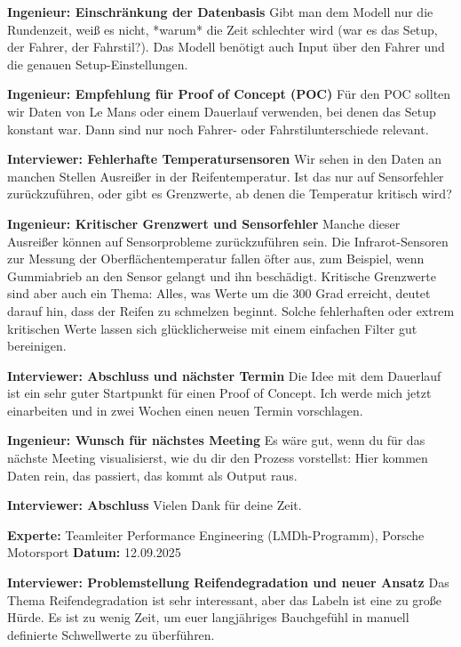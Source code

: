 \textbf{Ingenieur: Einschränkung der Datenbasis}
Gibt man dem Modell nur die Rundenzeit, weiß es nicht, *warum* die Zeit schlechter wird (war es das Setup, der Fahrer, der Fahrstil?). Das Modell benötigt auch Input über den Fahrer und die genauen Setup-Einstellungen.

\textbf{Ingenieur: Empfehlung für Proof of Concept (POC)}
Für den POC sollten wir Daten von Le Mans oder einem Dauerlauf verwenden, bei denen das Setup konstant war. Dann sind nur noch Fahrer- oder Fahrstilunterschiede relevant.

\textbf{Interviewer: Fehlerhafte Temperatursensoren}
Wir sehen in den Daten an manchen Stellen Ausreißer in der Reifentemperatur. Ist das nur auf Sensorfehler zurückzuführen, oder gibt es Grenzwerte, ab denen die Temperatur kritisch wird?

\textbf{Ingenieur: Kritischer Grenzwert und Sensorfehler}
Manche dieser Ausreißer können auf Sensorprobleme zurückzuführen sein. Die Infrarot-Sensoren zur Messung der Oberflächentemperatur fallen öfter aus, zum Beispiel, wenn Gummiabrieb an den Sensor gelangt und ihn beschädigt. Kritische Grenzwerte sind aber auch ein Thema: Alles, was Werte um die 300 Grad erreicht, deutet darauf hin, dass der Reifen zu schmelzen beginnt. Solche fehlerhaften oder extrem kritischen Werte lassen sich glücklicherweise mit einem einfachen Filter gut bereinigen.

\textbf{Interviewer: Abschluss und nächster Termin}
Die Idee mit dem Dauerlauf ist ein sehr guter Startpunkt für einen Proof of Concept. Ich werde mich jetzt einarbeiten und in zwei Wochen einen neuen Termin vorschlagen.

\textbf{Ingenieur: Wunsch für nächstes Meeting}
Es wäre gut, wenn du für das nächste Meeting visualisierst, wie du dir den Prozess vorstellst: Hier kommen Daten rein, das passiert, das kommt als Output raus.

\textbf{Interviewer: Abschluss}
Vielen Dank für deine Zeit.

\pagebreak
\nolinenumbers

\label{transkript-meeting2}

\textbf{Experte:} Teamleiter Performance Engineering (LMDh-Programm), Porsche Motorsport
\textbf{Datum:} 12.09.2025

\setcounter{linenumber}{1}
\linenumbers

\textbf{Interviewer: Problemstellung Reifendegradation und neuer Ansatz}
Das Thema Reifendegradation ist sehr interessant, aber das Labeln ist eine zu große Hürde. Es ist zu wenig Zeit, um euer langjähriges Bauchgefühl in manuell definierte Schwellwerte zu überführen.


